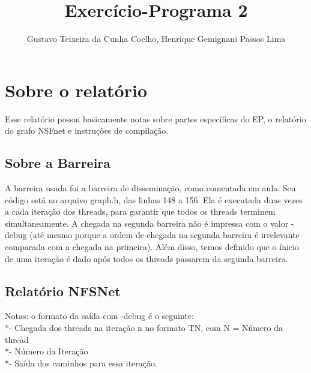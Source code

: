 \documentclass[11pt]{article} %
\title{Exercício-Programa 2}
\author{Gustavo Teixeira da Cunha Coelho, Henrique Gemignani Passos Lima}
\begin{document}
\maketitle

\section{Sobre o relatório}

Esse relatório possui basicamente notas sobre partes específicas do EP, o relatório do grafo NSFnet e instruções de compilação.

\subsection{Sobre a Barreira}
A barreira usada foi a barreira de disseminação, como comentada em aula. Seu código está no arquivo graph.h, das linhas 148 a 156. Ela é executada duas vezes a cada iteração dos threads, para garantir que todos os threads terminem simultaneamente. A chegada na segunda barreira não é impressa com o valor -debug (até mesmo porque a ordem de chegada na segunda barreira é irrelevante comparada com a chegada na primeira). Além disso, temos definido que o ínicio de uma iteração é dado após todos os threads passarem da segunda barreira.

\subsection{Relatório NFSNet}
Notas: o formato da saída com -debug é o seguinte:
\\*- Chegada dos threads na iteração n no formato TN, com N = Número da thread
\\*- Número da Iteração
\\*- Saída dos caminhos para essa iteração.
\end{document}
